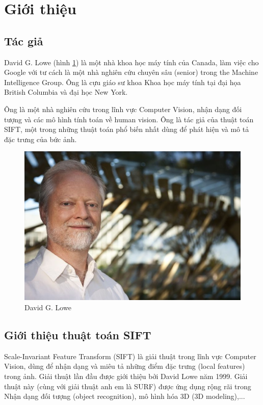 \documentclass[conference]{IEEEtran}
\begin{document}
\medskip
\section{Giới thiệu}
\subsection{Tác giả}
David G. Lowe (hình \ref{fig:tacgia}) là một nhà khoa học máy tính của Canada, làm việc cho Google với tư cách là một nhà nghiên cứu chuyên sâu (senior) trong the Machine Intelligence Group. Ông là cựu giáo sư khoa Khoa học máy tính tại đại họa British Columbia và đại học New York.


Ông là một nhà nghiên cứu trong lĩnh vực Computer Vision, nhận dạng đối tượng và các mô hình tính toán về human vision. Ông là tác giả của thuật toán SIFT, một trong những thuật toán phổ biến nhất dùng để phát hiện và mô tả đặc trưng của bức ảnh.
\begin{figure}
  \includegraphics[width=\linewidth]{tacgia}
  \caption{David G. Lowe}
  \label{fig:tacgia}
\end{figure}
\subsection{Giới thiệu thuật toán SIFT}

Scale-Invariant Feature Transform (SIFT) là giải thuật trong lĩnh vực Computer Vision, dùng để nhận dạng và miêu tả những điểm đặc trưng (local features) trong ảnh. Giải thuật lần đầu được giới thiệu bởi David Lowe năm 1999. Giải thuật này (cùng với giải thuật anh em là SURF) được ứng dụng rộng rãi trong Nhận dạng đối tượng (object recognition), mô hình hóa 3D (3D modeling),...
\end{document}
